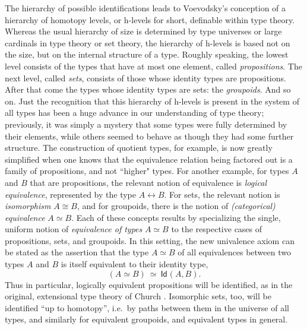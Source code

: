 \documentclass[11pt]{article}
\newcommand{\Id}{\mathsf{Id}}
\newcommand{\id}[1]{\Id_{#1}}
\theoremstyle{remark}
\theoremstyle{definition}
\begin{document}
The hierarchy of possible identifications leads to Voevodsky's conception of a hierarchy of homotopy levels, or h-levels for short, definable within type theory.  Whereas the usual hierarchy of size is determined by type universes or large cardinals in type theory or set theory, the hierarchy of h-levels is based not on the size, but on the internal structure of a type.  Roughly speaking, the lowest level consists of the types that have at most one element, called \emph{propositions}.  The next level, called \emph{sets}, consists of those whose identity types are propositions. After that come the types whose identity types are sets: the \emph{groupoids}.  And so on.  Just the recognition that this hierarchy of h-levels is present in the system of all types has been a huge advance in our understanding of type theory; previously, it was simply a mystery that some types were fully determined by their elements, while others seemed to behave as though they had some further structure.  The construction of quotient types, for example, is now greatly simplified when one knows that the equivalence relation being factored out is a family of propositions, and not ``higher" types.  For another example, for types $A$ and $B$ that are propositions, the relevant notion of equivalence is \emph{logical equivalence}, represented by the type $A\leftrightarrow B$.  For sets, the relevant notion is \emph{isomorphism} $A\cong B$, and for groupoids, there is the notion of \emph{(categorical) equivalence} $A\simeq B$.  Each of these concepts results by specializing the single, uniform notion of \emph{equivalence of types} $A\simeq B$ to the respective cases of propositions, sets, and groupoids.  In this setting, the new univalence axiom can be stated as the assertion that the type $A\simeq B$ of all equivalences between two types $A$ and $B$ is itself equivalent to their identity type,
\[\tag{UA}
(A\simeq B)\ \simeq\  \id{}(A,B).
\]
 Thus in particular, logically equivalent propositions will be identified, as in the original, extensional type theory of Church \cite{Church}.  Isomorphic sets, too, will be identified ``up to homotopy'', i.e.\ by paths between them in the universe of all types, and similarly for equivalent groupoids, and equivalent types in general.
\end{document}
